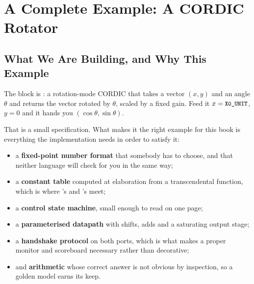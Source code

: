 \chapter{A Complete Example: A CORDIC Rotator}
\label{ch:case}


\section{What We Are Building, and Why This Example}
\label{sec:case:what}

The block is : a rotation-mode CORDIC that
takes a vector $(x, y)$ and an angle $\theta$ and returns the vector rotated
by $\theta$, scaled by a fixed gain. Feed it $x = \text{\texttt{\small X0\_UNIT}}$,
$y = 0$ and it hands you $(\cos\theta, \sin\theta)$.

That is a small specification. What makes it the right example for this book
is everything the implementation needs in order to satisfy it:

\begin{itemize}
  \item a \textbf{fixed-point number format} that somebody has to choose, and
        that neither language will check for you in the same way;
  \item a \textbf{constant table} computed at elaboration from a
        transcendental function, which is where \VHDL{}'s
         and \SV{}'s  meet;
  \item a \textbf{control state machine}, small enough to read on one page;
  \item a \textbf{parameterised datapath} with shifts, adds and a saturating
        output stage;
  \item a \textbf{handshake protocol} on both ports, which is what makes a
        proper monitor and scoreboard necessary rather than decorative;
  \item and \textbf{arithmetic} whose correct answer is not obvious by
        inspection, so a golden model earns its keep.
\end{itemize}

